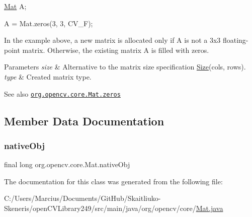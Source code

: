 {\ttfamily }

{\ttfamily \mbox{\hyperlink{classorg_1_1opencv_1_1core_1_1_mat}{Mat}} A;}

{\ttfamily }

{\ttfamily }

{\ttfamily A = Mat.\+zeros(3, 3, C\+V\+\_\+F);}

{\ttfamily }

{\ttfamily }

{\ttfamily In the example above, a new matrix is allocated only if {\ttfamily A} is not a 3x3 floating-\/point matrix. Otherwise, the existing matrix {\ttfamily A} is filled with zeros. }


\begin{DoxyParams}{Parameters}
{\em size} & Alternative to the matrix size specification {\ttfamily \mbox{\hyperlink{classorg_1_1opencv_1_1core_1_1_size}{Size}}(cols, rows)}. \\
\hline
{\em type} & Created matrix type.\\
\hline
\end{DoxyParams}
\begin{DoxySeeAlso}{See also}
\href{http://docs.opencv.org/modules/core/doc/basic_structures.html#mat-zeros}{\tt org.\+opencv.\+core.\+Mat.\+zeros} 
\end{DoxySeeAlso}


\subsection{Member Data Documentation}
\mbox{\label{classorg_1_1opencv_1_1core_1_1_mat_a497713e25ec636f1185e08d7692d065b}} 
\subsubsection{\texorpdfstring{native\+Obj}{nativeObj}}
{\footnotesize\ttfamily final long org.\+opencv.\+core.\+Mat.\+native\+Obj}



The documentation for this class was generated from the following file\+:\begin{DoxyCompactItemize}
\item 
C\+:/\+Users/\+Marcius/\+Documents/\+Git\+Hub/\+Skaitliuko-\/\+Skeneris/open\+C\+V\+Library249/src/main/java/org/opencv/core/\mbox{\hyperlink{_mat_8java}{Mat.\+java}}\end{DoxyCompactItemize}
